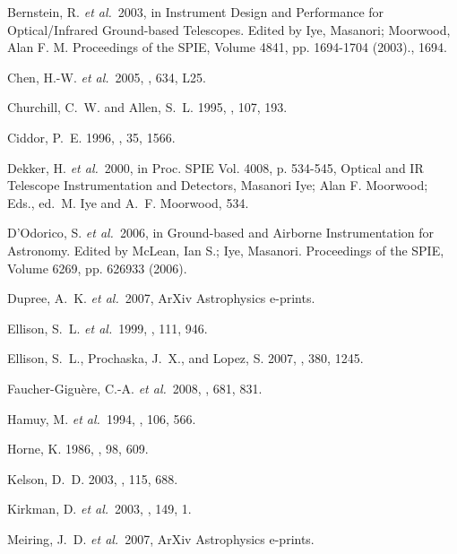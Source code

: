 \documentclass[12pt,preprint]{aastex}
\begin{document}
\begin{thebibliography}{}

{Bernstein}, R. {\it et al.}\  2003, in { Instrument Design and Performance for
  Optical/Infrared Ground-based Telescopes. Edited by Iye, Masanori; Moorwood,
  Alan F. M. Proceedings of the SPIE, Volume 4841, pp. 1694-1704 (2003).},
  1694.

{Chen}, H.-W. {\it et al.}\  2005, \apjl, 634, L25.

{Churchill}, C.~W. and {Allen}, S.~L. 1995, \pasp, 107, 193.

{Ciddor}, P.~E. 1996, \ao, 35, 1566.

{Dekker}, H. {\it et al.}\  2000, in { Proc. SPIE Vol. 4008, p. 534-545,
  Optical and IR Telescope Instrumentation and Detectors, Masanori Iye; Alan F.
  Moorwood; Eds.}, ed.\ M. {Iye} and A.~F. {Moorwood}, 534.

{D'Odorico}, S. {\it et al.}\  2006, in { Ground-based and Airborne
  Instrumentation for Astronomy. Edited by McLean, Ian S.; Iye, Masanori.
  Proceedings of the SPIE, Volume 6269, pp. 626933 (2006).}

{Dupree}, A.~K. {\it et al.}\  2007, ArXiv Astrophysics e-prints.

{Ellison}, S.~L. {\it et al.}\  1999, \pasp, 111, 946.

{Ellison}, S.~L., {Prochaska}, J.~X., and {Lopez}, S. 2007, \mnras, 380, 1245.

{Faucher-Gigu{\`e}re}, C.-A. {\it et al.}\  2008, \apj, 681, 831.

{Hamuy}, M. {\it et al.}\  1994, \pasp, 106, 566.

{Horne}, K. 1986, \pasp, 98, 609.

{Kelson}, D.~D. 2003, \pasp, 115, 688.

{Kirkman}, D. {\it et al.}\  2003, \apjs, 149, 1.

{Meiring}, J.~D. {\it et al.}\  2007, ArXiv Astrophysics e-prints.


\end{thebibliography}
\end{document}
